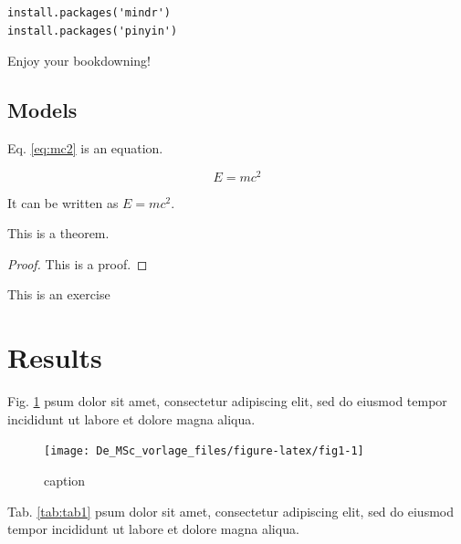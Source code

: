 \documentclass[]{book}
\theoremstyle{definition}
\theoremstyle{definition}
\theoremstyle{definition}
\theoremstyle{remark}
\let\BeginKnitrBlock\begin \let\EndKnitrBlock\end
\begin{document}
\begin{verbatim}
install.packages('mindr')
install.packages('pinyin')
\end{verbatim}

Enjoy your bookdowning!

\subsection{Models}\label{models}

Eq. \eqref{eq:mc2} is an equation.

\begin{equation} 
E = mc^2
  \label{eq:mc2}
\end{equation}

It can be written as \(E = mc^2\).

\BeginKnitrBlock{theorem}
\protect\hypertarget{thm:lik}{}{\label{thm:lik} }This is a theorem.
\EndKnitrBlock{theorem} \BeginKnitrBlock{proof}

{}This is a proof.
\EndKnitrBlock{proof}

\BeginKnitrBlock{exercise}
\protect\hypertarget{exr:unnamed-chunk-17}{}{\label{exr:unnamed-chunk-17}
}This is an exercise
\EndKnitrBlock{exercise}

\section{Results}\label{results}

Fig. \ref{fig:fig1} psum dolor sit amet, consectetur adipiscing elit,
sed do eiusmod tempor incididunt ut labore et dolore magna aliqua.

\begin{figure}

{\centering \texttt{[image: De\_MSc\_vorlage\_files/figure-latex/fig1-1]} 

}

\caption{caption}\label{fig:fig1}
\end{figure}

Tab. \ref{tab:tab1} psum dolor sit amet, consectetur adipiscing elit,
sed do eiusmod tempor incididunt ut labore et dolore magna aliqua.
\end{document}
